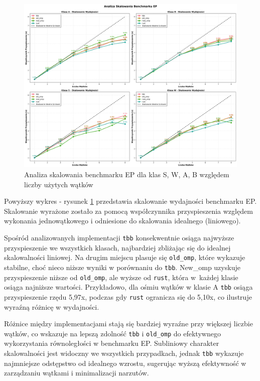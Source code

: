 \begin{figure}[H]
    \centering
    \includegraphics[width=\textwidth]{analiza/images/parallel/ep/arm/ep_analiza_skalowania.png}
    \caption{Analiza skalowania benchmarku EP dla klas S, W, A, B względem liczby użytych wątków}
    \label{ep_analiza_skalowania}
\end{figure}
Powyższy wykres - rysunek \ref{ep_analiza_skalowania} przedstawia skalowanie wydajności benchmarku EP. Skalowanie wyrażone zostało za pomocą współczynnika przyspieszenia względem wykonania jednowątkowego i odniesione do skalowania idealnego (liniowego).

Spośród analizowanych implementacji \texttt{tbb} konsekwentnie osiąga najwyższe przyspieszenie we wszystkich klasach, najbardziej zbliżając się do idealnej skalowalności liniowej. Na drugim miejscu plasuje się \texttt{old\_omp}, które wykazuje stabilne, choć nieco niższe wyniki w porównaniu do \texttt{tbb}. New\_omp uzyskuje przyspieszenie niższe od \texttt{old\_omp}, ale wyższe od \texttt{rust}, która w~każdej klasie osiąga najniższe wartości. Przykładowo, dla ośmiu wątków w klasie A \texttt{tbb} osiąga przyspieszenie rzędu 5,97x, podczas gdy \texttt{rust} ogranicza się do 5,10x, co ilustruje wyraźną różnicę w wydajności.

Różnice między implementacjami stają się bardziej wyraźne przy większej liczbie wątków, co wskazuje na lepszą zdolność \texttt{tbb} i \texttt{old\_omp} do efektywnego wykorzystania równoległości w benchmarku EP. Subliniowy charakter skalowalności jest widoczny we wszystkich przypadkach, jednak \texttt{tbb} wykazuje najmniejsze odstępstwo od idealnego wzrostu, sugerując wyższą efektywność w zarządzaniu wątkami i minimalizacji narzutów.

